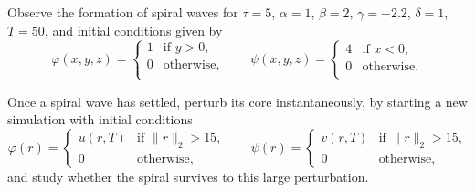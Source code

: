 \documentclass[a4paper]{siamonline220329}
\theoremstyle{plain}
\renewcommand\phi\varphi
\begin{document}
\begin{question}
  Observe the formation of spiral waves for $\tau = 5$, $\alpha =1$, $\beta =2$, $\gamma
  =-2.2$, $\delta =1$, $T=50$, and initial conditions given by
  \[
    \phi(x,y,z) = 
    \begin{cases}
      1 & \text{if $y > 0$,} \\
      0 & \text{otherwise,} \\
    \end{cases}
    \qquad 
    \psi(x,y,z) = 
    \begin{cases}
      4 & \text{if $x < 0$,} \\
      0 & \text{otherwise.} \\
    \end{cases}
  \]

Once a spiral wave has settled, perturb its core instantaneously, by starting a new
simulation with initial conditions
\[
  \phi(r) = 
  \begin{cases}
    u(r,T) & \text{if $\| r \|_2  > 15$,} \\
    0      & \text{otherwise,} 
  \end{cases}
  \qquad 
  \psi(r) = 
  \begin{cases}
    v(r,T) & \text{if $\| r \|_2  > 15$,} \\
    0      & \text{otherwise,} 
  \end{cases}
\]
and study whether the spiral survives to this large perturbation.
\end{question}



% 
% 
\end{document}
